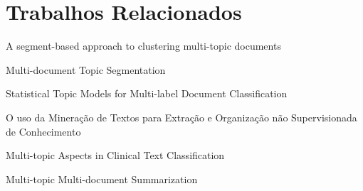 \section{Trabalhos Relacionados}



A segment-based approach to clustering multi-topic documents~\cite{Tagarelli2013}

Multi-document Topic Segmentation~\cite{Jeong:2010}

Statistical Topic Models for Multi-label Document Classification~\cite{Rubin:2012}

O uso da Mineração de Textos para Extração e Organização não Supervisionada de Conhecimento~\cite{Rezende2011}

Multi-topic Aspects in Clinical Text Classification~\cite{Sasaki:2007}

Multi-topic Multi-document Summarization~\cite{Masao:2000}

